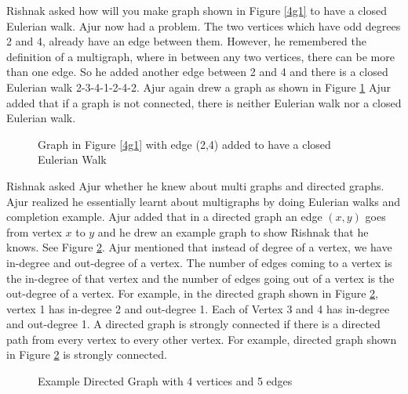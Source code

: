 Rishnak asked how will you make graph shown in Figure \ref{4g1} to have a closed Eulerian walk. Ajur now had a problem. The two vertices which have odd degrees 2 and 4, already have an edge between them. However, he remembered the definition of a multigraph, where in between any two vertices, there can be more than one edge. So he added another edge between 2 and 4 and there is a closed Eulerian walk 2-3-4-1-2-4-2. Ajur again drew a graph as shown in Figure \ref{4g155}
Ajur added that if a graph is not connected, there is neither Eulerian walk nor a closed Eulerian walk.
\begin{figure}
\begin{center}
\caption{ Graph in Figure \ref{4g1} with edge (2,4) added to have a closed Eulerian Walk}\label{4g155}
\end{center}
\end{figure}

\vspace{3in}
Rishnak asked Ajur whether he knew about multi graphs and directed graphs. Ajur realized he essentially learnt about multigraphs  by doing Eulerian walks and completion  example. Ajur added that in a directed graph an edge $(x,y)$ goes from vertex $x$ to $y$ and he drew an example graph to show Rishnak that he knows. See Figure \ref{4g5}. Ajur mentioned that instead of degree of a vertex, we have in-degree and out-degree of a vertex. The number of edges coming to a vertex is the in-degree of that vertex and the number of edges going out of a vertex is the out-degree of a vertex. For example, in the directed graph shown in Figure \ref{4g5}, vertex 1 has in-degree 2 and out-degree 1. Each of Vertex 3 and 4 has in-degree  and out-degree 1. A directed graph is strongly connected if there is a directed path from every vertex to every other vertex. For example, directed graph shown in Figure \ref{4g5} is strongly connected. 
\begin{figure}
\begin{center}
\caption{ Example Directed Graph with 4 vertices and 5 edges}\label{4g5}
\end{center}
\end{figure}


